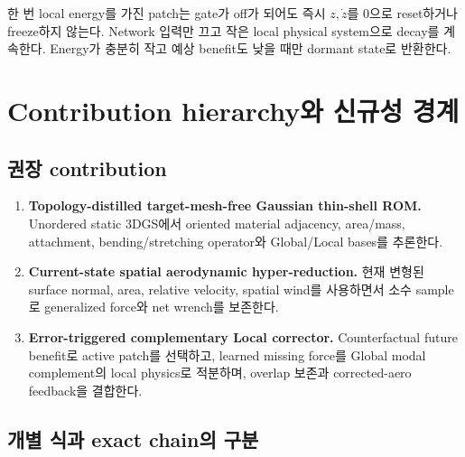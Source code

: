\documentclass[11pt,a4paper]{article}
\begin{document}
한 번 local energy를 가진 patch는 gate가 off가 되어도 즉시 \(z,\dot z\)를 0으로 reset하거나 freeze하지 않는다.
Network 입력만 끄고 작은 local physical system으로 decay를 계속한다.
Energy가 충분히 작고 예상 benefit도 낮을 때만 dormant state로 반환한다.

\section{Contribution hierarchy와 신규성 경계}

\subsection{권장 contribution}

\begin{enumerate}[leftmargin=1.7em]
  \item \textbf{Topology-distilled target-mesh-free Gaussian thin-shell ROM.}
  Unordered static 3DGS에서 oriented material adjacency, area/mass, attachment,
  bending/stretching operator와 Global/Local bases를 추론한다.
  \item \textbf{Current-state spatial aerodynamic hyper-reduction.}
  현재 변형된 surface normal, area, relative velocity, spatial wind를 사용하면서
  소수 sample로 generalized force와 net wrench를 보존한다.
  \item \textbf{Error-triggered complementary Local corrector.}
  Counterfactual future benefit로 active patch를 선택하고,
  learned missing force를 Global modal complement의 local physics로 적분하며,
  overlap 보존과 corrected-aero feedback을 결합한다.
\end{enumerate}

\subsection{개별 식과 exact chain의 구분}
\end{document}
